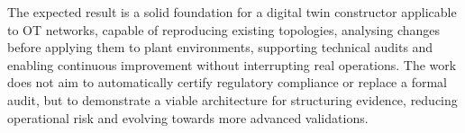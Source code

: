 The expected result is a solid foundation for a digital twin constructor applicable to OT networks, capable of reproducing existing topologies, analysing changes before applying them to plant environments, supporting technical audits and enabling continuous improvement without interrupting real operations. The work does not aim to automatically certify regulatory compliance or replace a formal audit, but to demonstrate a viable architecture for structuring evidence, reducing operational risk and evolving towards more advanced validations.
